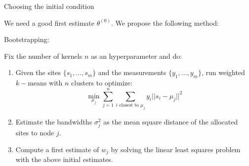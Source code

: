 \documentclass[aspectratio=169]{beamer}
\begin{document}
\begin{frame}{Choosing the initial condition}

	We need a good first estimate $\theta^{(0)}$. We propose the following method: 

	\vfill

	\alert{Bootstrapping:}

	Fix the number of kernels $n$ as an hyperparameter and do:
	\vfill
	\begin{enumerate}
		\item Given the sites $\{s_1,\ldots,s_m\}$ and the measurements $\{y_1,\ldots,y_m\}$, run \alert{weighted $k-$means} with $n$ clusters to optimize:
		\begin{equation*}
			\min_{\mu_j} \sum_{j=1}^n \sum_{i \text{ closest to } \mu_j} y_i ||s_i-\mu_j||^2
		\end{equation*}

		\item Estimate the bandwidths $\sigma_j^2$ as the mean square distance of the allocated sites to node $j$.
		
		\item Compute a first estimate of $w_j$ by solving the linear least squares problem with the above initial estimates.
	\end{enumerate}
\end{frame}
\end{document}
